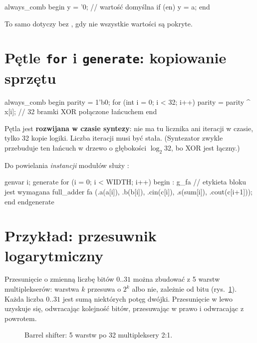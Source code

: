 \begin{sv}
always_comb begin
  y = '0;           // wartość domyślna
  if (en) y = a;
end
\end{sv}

To samo dotyczy  bez , gdy nie wszystkie wartości są
pokryte.

\section{Pętle \texttt{for} i \texttt{generate}: kopiowanie sprzętu}

\begin{sv}
always_comb begin
  parity = 1'b0;
  for (int i = 0; i < 32; i++)
    parity = parity ^ x[i];       // 32 bramki XOR połączone łańcuchem
end
\end{sv}

Pętla jest \textbf{rozwijana w czasie syntezy}: nie ma tu licznika ani iteracji
w czasie, tylko 32 kopie logiki. Liczba iteracji musi być stała.
(Syntezator zwykle przebuduje ten łańcuch w drzewo o głębokości $\log_2 32$, bo XOR
jest łączny.)

Do powielania \emph{instancji} modułów służy :
\begin{sv}
genvar i;
generate
  for (i = 0; i < WIDTH; i++) begin : g_fa      // etykieta bloku jest wymagana
    full_adder fa (.a(a[i]), .b(b[i]), .cin(c[i]), .s(sum[i]), .cout(c[i+1]));
  end
endgenerate
\end{sv}

\section{Przykład: przesuwnik logarytmiczny}

Przesunięcie o zmienną liczbę bitów $0..31$ można zbudować z 5 warstw
multiplekserów: warstwa $k$ przesuwa o $2^k$ albo nie, zależnie od bitu
 (rys.~\ref{fig:barrel}). Każda liczba $0..31$ jest sumą
niektórych potęg dwójki. Przesunięcie w lewo uzyskuje się, odwracając
kolejność bitów, przesuwając w prawo i odwracając z powrotem.

\begin{figure}[h]
\centering
{}
\caption{Barrel shifter: 5 warstw po 32 multipleksery 2:1.}
\label{fig:barrel}
\end{figure}

